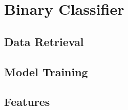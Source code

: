 \chapter{Binary Classifier}
\label{chap:classifier}

\section{Data Retrieval}
\label{sec:DataRetrieval}



\section{Model Training}
\label{sec:ModelTraining}

\section{Features}
\label{sec:Features}

